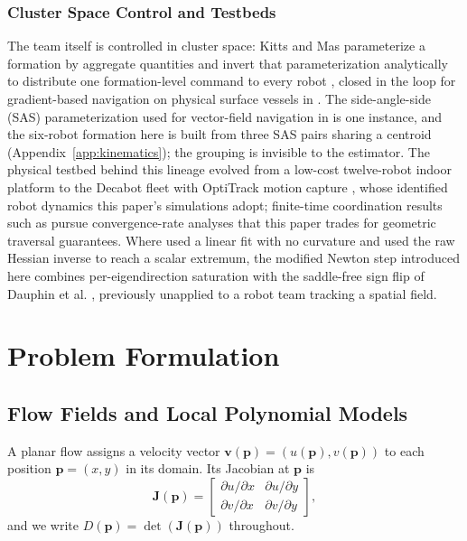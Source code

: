 \documentclass[lettersize,journal]{IEEEtran}
\begin{document}
\subsubsection{Cluster Space Control and Testbeds}
The team itself is controlled in cluster space: Kitts and Mas
parameterize a formation by aggregate quantities and invert that
parameterization analytically to distribute one formation-level command
to every robot \cite{30}, closed in the loop for gradient-based
navigation on physical surface vessels in \cite{31}. The
side-angle-side (SAS) parameterization used for vector-field navigation
in \cite{14} is one instance, and the six-robot formation here is built
from three SAS pairs sharing a centroid
(Appendix~\ref{app:kinematics}); the grouping is invisible to the
estimator. The physical testbed behind this lineage evolved from a
low-cost twelve-robot indoor platform \cite{32} to the Decabot fleet
with OptiTrack motion capture \cite{33}, whose identified robot
dynamics this paper's simulations adopt; finite-time coordination
results such as \cite{34} pursue convergence-rate analyses that this
paper trades for geometric traversal guarantees. Where \cite{14} used a
linear fit with no curvature and \cite{15} used the raw Hessian inverse
to reach a scalar extremum, the modified Newton step introduced here
combines per-eigendirection saturation with the saddle-free sign flip
of Dauphin et al. \cite{35}, previously unapplied to a robot team
tracking a spatial field.


\section{Problem Formulation}
\label{sec:detj_field}

\subsection{Flow Fields and Local Polynomial Models}

A planar flow assigns a velocity vector $\mathbf{v}(\mathbf{p}) =
(u(\mathbf{p}), v(\mathbf{p}))$ to each position $\mathbf{p} = (x, y)$ in its
domain. Its Jacobian at $\mathbf{p}$ is
\begin{equation}
    \mathbf{J}(\mathbf{p}) =
    \begin{bmatrix}
        \partial u / \partial x & \partial u / \partial y \\
        \partial v / \partial x & \partial v / \partial y
    \end{bmatrix},
    \label{eq:jacobian}
\end{equation}
and we write $D(\mathbf{p}) = \det(\mathbf{J}(\mathbf{p}))$ throughout.
\end{document}
